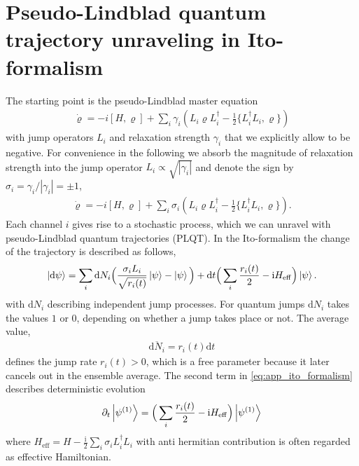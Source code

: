 \documentclass[twocolumn,prl,superscriptaddress]{revtex4-2}
\renewcommand{\i}{\mathrm i}
\begin{document}
\setcounter{equation}{0}
\makeatletter
\renewcommand{\theequation}{A\arabic{equation}}

\onecolumngrid

\section{Pseudo-Lindblad quantum trajectory unraveling in Ito-formalism}
The starting point is the pseudo-Lindblad master equation
\begin{align}
	\dot \varrho = -i[H, \varrho] + \sum\limits_{i} \gamma_i \left( L_i \varrho L_i^\dagger - \frac{1}{2} \{ L_i^\dagger L_i,\varrho \} \right) 
\end{align}
with jump operators $L_i$ and relaxation strength $\gamma_i$ that we explicitly allow to be negative. For convenience in the following we absorb the magnitude of relaxation strength into the jump operator $L_i \propto \sqrt{|\gamma_i|}$ and denote the sign by $\sigma_i=\gamma_i/|\gamma_i|=\pm 1$,
\begin{align}
	\dot \varrho = -i[H, \varrho] + \sum\limits_{i} \sigma_i \left( L_i \varrho L_i^\dagger - \frac{1}{2} \{ L_i^\dagger L_i,\varrho \} \right) .
	\label{eq:app_pseudo_lindblad}
\end{align}
Each channel $i$ gives rise to a stochastic process, which we can unravel with pseudo-Lindblad quantum trajectories (PLQT). In the Ito-formalism the change of the trajectory is described as follows,
\begin{align}
	\ket{ \mathrm d\psi} = \sum_i \mathrm d N_i \Big(\frac{\sigma_i L_i }{\sqrt{ r_i(t)}} \ket{\psi} - \ket \psi \Big) + \mathrm d t \Big( \sum_i \frac{ r_i(t)}{2} - \i H_\mathrm{eff} \Big) \ket \psi.
	\label{eq:app_ito_formalism}
\end{align}
with $\mathrm d N_i$ describing independent jump processes. For quantum jumps $\mathrm d N_i$ takes the values $1$ or $0$, depending on whether a jump takes place or not. The average value,
\begin{align}
	\overline{\mathrm d N_i} =  r_i(t) \mathrm d t
\end{align}
defines the jump rate $r_i(t)>0$, which is a free parameter because it later cancels out in the ensemble average. The second term in \cref{eq:app_ito_formalism} describes deterministic evolution 
\begin{align}
	\partial_t \ket{\psi^{(1)}} = \Big(\sum_i \frac{ r_i(t)}{2} - \i H_\mathrm{eff} \Big) \ket{\psi^{(1)}} 
	\label{eq:app_deterministic}
\end{align}
where $H_\mathrm{eff} = H - \frac{\i}{2} \sum_i \sigma_i L_i^\dagger L_i$ with anti hermitian contribution is often regarded as effective Hamiltonian. 
\end{document}

